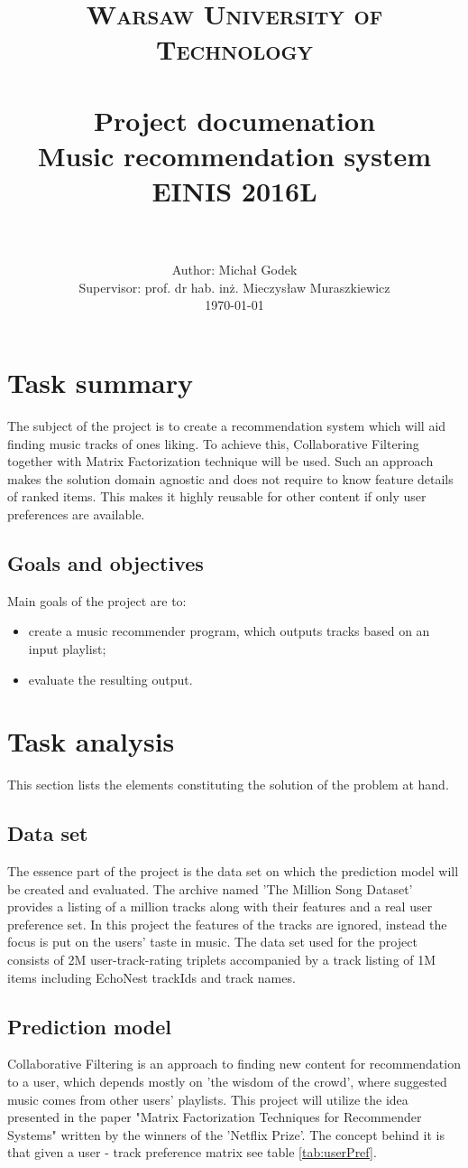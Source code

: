 \documentclass{article}
\title{
		\usefont{OT1}{bch}{b}{n}
		\normalfont \normalsize \textsc{Warsaw University of Technology} \\ [25pt]
		\horrule{1pt} \\[0.4cm]
		\normalfont \normalsize Project documenation\\
		\huge Music recommendation system \\[0.3cm]
		\normalfont \normalsize EINIS 2016L\\
		\horrule{1pt} \\[0.5cm]
}
\author{
		\normalfont 	\normalsize
        Author: Michał Godek	\normalsize \\[0.2cm]
        \footnotesize Supervisor: prof. dr hab. inż. Mieczysław Muraszkiewicz \normalfont 	 \normalsize \\[0.5cm]
        \today \\[-3pt]
}
\date{}
\numberwithin{equation}{section}		%
\numberwithin{figure}{section}			%
\numberwithin{table}{section}				%
\begin{document}
\maketitle
\newpage
\tableofcontents
\newpage

\section{Task summary}
The subject of the project is to create a recommendation system which will aid finding music tracks of ones liking. To achieve this, Collaborative Filtering together with Matrix Factorization technique will be used. Such an approach makes the solution domain agnostic and does not require to know feature details of ranked items. This makes it highly reusable for other content if only user preferences are available.

\subsection{Goals and objectives}
Main goals of the project are to:
\begin{itemize}
	\item create a music recommender program, which outputs tracks based on an input playlist;
	\item evaluate the resulting output.
\end{itemize}

\section{Task analysis}
This section lists the elements constituting the solution of the problem at hand.

\subsection{Data set}
The essence part of the project is the data set on which the prediction model will be created and evaluated. The archive named 'The Million Song Dataset'\cite{Bertin-Mahieux2011} provides a listing of a million tracks along with their features and a real user preference set. In this project the features of the tracks are ignored, instead the focus is put on the users' taste in music.
The data set used for the project consists of 2M user-track-rating triplets accompanied by a track listing of 1M items including EchoNest trackIds and track names.

\subsection{Prediction model}
Collaborative Filtering is an approach to finding new content for recommendation to a user, which depends mostly on 'the wisdom of the crowd', where suggested music comes from other users' playlists\cite{MatrixFactPython}. 
This project will utilize the idea presented in the paper "Matrix Factorization
Techniques for Recommender Systems"\cite{Koren:2009:MFT:1608565.1608614} written by the winners of the 'Netflix Prize'. The concept behind it is that given a user - track preference matrix see table \vref{tab:userPref}.
\end{document}
